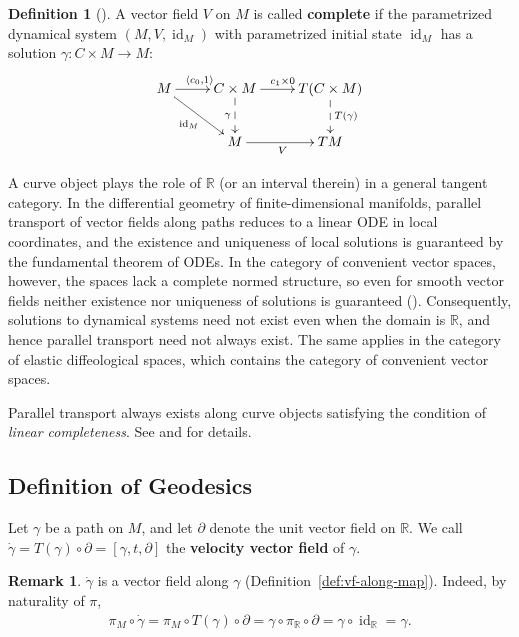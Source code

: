 \documentclass{amsart}
\newcommand{\R}{\mathbb{R}}
\DeclareMathOperator{\id}{id}
\theoremstyle{definition}
\newtheorem{defn}[thm]{Definition}
\newtheorem{rem}[thm]{Remark}
\begin{document}
\begin{defn}[{\cite[Definition~4.9]{CCL}}]\label{def:complete-vector-field}
  A vector field $V$ on $M$ is called \textbf{complete} if the parametrized
  dynamical system $(M, V, \id_M)$ with parametrized initial state $\id_M$
  has a solution $\gamma \colon C \times M \to M$:
  \[
    \xymatrix{
      M \ar[r]^{\langle c_0, 1\rangle} \ar[dr]_{\id_M}
        & C \times M \ar[r]^{c_1 \times 0} \ar@{-->}[d]_{\gamma}
        & T(C \times M) \ar@{-->}[d]^{T(\gamma)} \\
      & M \ar[r]_{V}
        & TM
    }
  \]
\end{defn}

A curve object plays the role of $\R$ (or an interval therein) in a general tangent
category. In the differential geometry of finite-dimensional manifolds,
parallel transport of vector fields along paths reduces to a linear ODE in local
coordinates, and the existence and uniqueness of local solutions is guaranteed by
the fundamental theorem of ODEs. In the category of convenient vector spaces,
however, the spaces lack a complete normed structure, so even for smooth vector
fields neither existence nor uniqueness of solutions is guaranteed
(\cite[Remark~4.5]{CCL}). Consequently, solutions to dynamical systems need not
exist even when the domain is $\R$, and hence parallel transport need not always
exist. The same applies in the category of elastic diffeological spaces,
which contains the category of convenient vector spaces.

Parallel transport always exists along curve objects satisfying the condition
of \emph{linear completeness}. See \cite[Theorem~5.20]{CC17} and
\cite[Remark~5.4]{CCL} for details.

\subsection{Definition of Geodesics}\label{subsec:geodesic-def}

Let $\gamma$ be a path on $M$, and let $\partial$ denote the unit vector field
on $\R$. We call $\dot{\gamma} = T(\gamma) \circ \partial = [\gamma, t, \partial]$
the \textbf{velocity vector field} of $\gamma$.

\begin{rem}\label{rem:velocity-along}
  $\dot{\gamma}$ is a vector field along $\gamma$
  (Definition~\ref{def:vf-along-map}). Indeed, by naturality of $\pi$,
  \begin{align*}
    \pi_{M} \circ \dot{\gamma}
      = \pi_{M} \circ T(\gamma) \circ \partial
      = \gamma \circ \pi_{\R} \circ \partial
      = \gamma \circ \id_{\R}
      = \gamma.
  \end{align*}
\end{rem}
\end{document}
